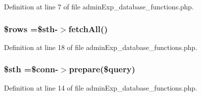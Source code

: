 Definition at line 7 of file admin\-Exp\-\_\-database\-\_\-functions.\-php.

\hypertarget{admin_exp__database__functions_8php_ace2ec39e7df3899fa8df9640ec274b03}{
\subsubsection[{\$rows}]{\setlength{\rightskip}{0pt plus 5cm}\$rows =\$sth-\/$>$fetch\-All()}}\label{admin_exp__database__functions_8php_ace2ec39e7df3899fa8df9640ec274b03}


Definition at line 18 of file admin\-Exp\-\_\-database\-\_\-functions.\-php.

\hypertarget{admin_exp__database__functions_8php_afa9126f9664959c02795be300a135f93}{
\subsubsection[{\$sth}]{\setlength{\rightskip}{0pt plus 5cm}\$sth =\$conn-\/$>$prepare(\$query)}}\label{admin_exp__database__functions_8php_afa9126f9664959c02795be300a135f93}


Definition at line 14 of file admin\-Exp\-\_\-database\-\_\-functions.\-php.

